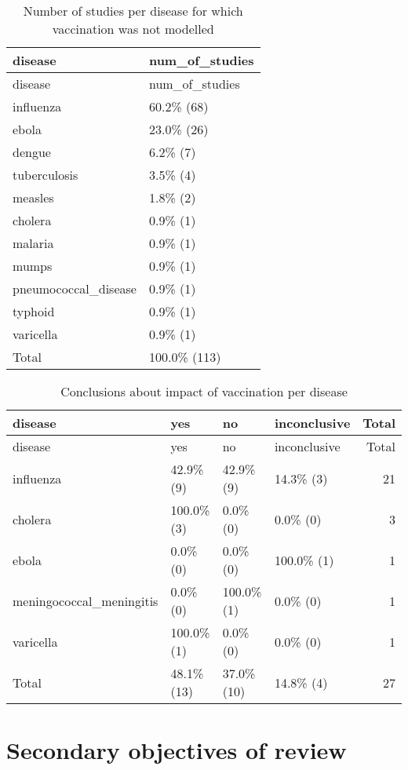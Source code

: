 \documentclass[
]{article}
\begin{document}
\begin{longtable}[]{@{}ll@{}}
\caption{Number of studies per disease for which vaccination was not
modelled}\tabularnewline
\toprule
disease & num\_of\_studies \\
\midrule
\endfirsthead
\toprule
disease & num\_of\_studies \\
\midrule
\endhead
influenza & 60.2\% (68) \\
ebola & 23.0\% (26) \\
dengue & 6.2\% (7) \\
tuberculosis & 3.5\% (4) \\
measles & 1.8\% (2) \\
cholera & 0.9\% (1) \\
malaria & 0.9\% (1) \\
mumps & 0.9\% (1) \\
pneumococcal\_disease & 0.9\% (1) \\
typhoid & 0.9\% (1) \\
varicella & 0.9\% (1) \\
Total & 100.0\% (113) \\
\bottomrule
\end{longtable}

\begin{longtable}[]{@{}llllr@{}}
\caption{Conclusions about impact of vaccination per
disease}\tabularnewline
\toprule
disease & yes & no & inconclusive & Total \\
\midrule
\endfirsthead
\toprule
disease & yes & no & inconclusive & Total \\
\midrule
\endhead
influenza & 42.9\% (9) & 42.9\% (9) & 14.3\% (3) & 21 \\
cholera & 100.0\% (3) & 0.0\% (0) & 0.0\% (0) & 3 \\
ebola & 0.0\% (0) & 0.0\% (0) & 100.0\% (1) & 1 \\
meningococcal\_meningitis & 0.0\% (0) & 100.0\% (1) & 0.0\% (0) & 1 \\
varicella & 100.0\% (1) & 0.0\% (0) & 0.0\% (0) & 1 \\
Total & 48.1\% (13) & 37.0\% (10) & 14.8\% (4) & 27 \\
\bottomrule
\end{longtable}

\hypertarget{secondary-objectives-of-review}{%
\section{Secondary objectives of
review}\label{secondary-objectives-of-review}}
\end{document}
